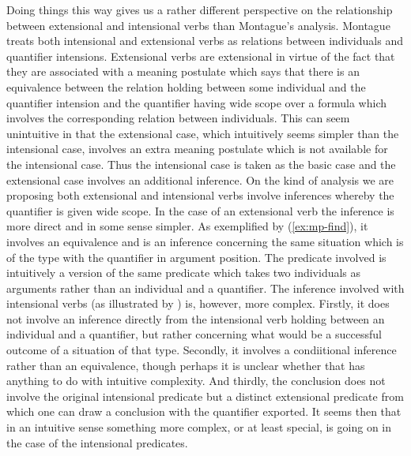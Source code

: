 Doing things this way gives us a rather different perspective on the
relationship between extensional and intensional verbs than Montague's
analysis.  Montague treats both intensional and extensional verbs as
relations between individuals and quantifier intensions.  Extensional
verbs are extensional in virtue of the fact that they are associated
with a meaning postulate which says that there is an equivalence
between the relation holding between some individual and the
quantifier intension and the quantifier having wide scope over
a formula which involves the corresponding relation between
individuals.  This can seem unintuitive in that the extensional case,
which intuitively seems simpler than the intensional case, involves an
extra meaning postulate which is not available for the intensional
case.  Thus the intensional case is taken as the basic case and the
extensional case involves an additional inference.  On the kind of
analysis we are proposing both extensional and intensional verbs
involve inferences whereby the quantifier is given wide scope.  In the
case of an extensional verb the inference is more direct and in some
sense simpler.  As exemplified by (\ref{ex:mp-find}), it involves an equivalence and is an inference
concerning the same situation which is of the type with the quantifier
in argument position.  The predicate involved is intuitively a version
of the same predicate which takes two individuals as arguments rather
than an individual and a quantifier.  The inference involved with
intensional verbs (as illustrated by \preveg{}) is, however, more
complex.  Firstly, it does not involve an inference directly from the
intensional verb holding between an individual and a quantifier, but
rather concerning what would be a successful outcome of a situation of
that type.  Secondly, it involves a condiitional inference rather than
an equivalence, though perhaps it is unclear whether that has anything
to do with intuitive complexity.  And thirdly, the conclusion does not
involve the original intensional predicate but a distinct extensional
predicate from which one can draw a conclusion with the quantifier
exported.  It seems then that in an intuitive sense something more
complex, or at least special, is going on in the case of the
intensional predicates.

